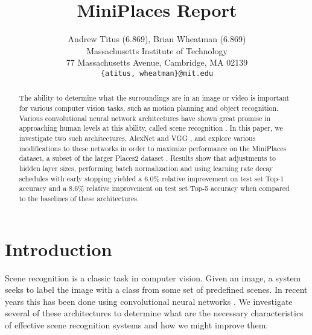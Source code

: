 \documentclass[10pt,twocolumn,letterpaper]{article}
\begin{document}
\title{MiniPlaces Report}

\author{Andrew Titus (6.869), Brian Wheatman (6.869)\\
Massachusetts Institute of Technology\\
77 Massachusetts Avenue, Cambridge, MA 02139\\
{\tt\small \{atitus, wheatman\}@mit.edu}
}

\maketitle

\begin{abstract}
The ability to determine what the surroundings are
in an image or video is important for various computer vision tasks,
such as motion planning and object recognition. Various
convolutional neural network architectures have shown great
promise in approaching human levels at this ability, called
scene recognition \cite{Places}. In this paper, we
investigate two such architectures, AlexNet \cite{AlexNet}
and VGG \cite{VGG}, and explore various modifications to these
networks in order to maximize performance on the MiniPlaces
dataset, a subset of the larger Places2 dataset \cite{Places}.
Results show that adjustments to hidden layer sizes, performing
batch normalization and using learning rate decay schedules with
early stopping yielded a $6.0\%$
relative improvement on test set Top-1 accuracy and a
$8.6\%$ relative improvement
on test set Top-5 accuracy when compared to the baselines of these
architectures.
\end{abstract}

\section{Introduction}
Scene recognition is a classic task in computer vision.  Given an image, a system seeks to label the image with a class from some set of predefined scenes.  In recent years this has been done using convolutional neural networks\cite{AlexNet} \cite{VGG}.  We investigate several of these architectures to determine what are the necessary characteristics of effective scene recognition systems and how we might improve them.  
\end{document}
